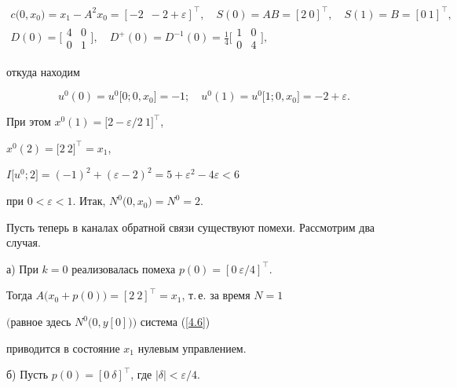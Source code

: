 \begin{exams}
\begin{gather*}
c\bigl(0, x_0\bigr)=x_1-A^2 x_0=[-2\ \; -2+\varepsilon]^{\top},\quad


S(0)=A B=[2\ 0]^{\top},\quad S(1)=B=[0\ 1]^{\top}, \\


D(0)=\bigl[\begin{smallmatrix}


4 & 0 \\ 0 & 1


\end{smallmatrix}\bigr],\quad


D^+(0)=D^{-1}(0)=\tfrac{1}{4}\bigl[\begin{smallmatrix}


1 & 0 \\ 0 & 4\end{smallmatrix}\bigr],


\end{gather*}


откуда находим


$$


u^0(0)=u^0\bigl[0; 0, x_0\bigr]=-1 ;\quad u^0(1)=u^0\bigl[1; 0, x_0\bigr]=


-2+\varepsilon.


$$


При этом $x^0(1)=\bigl[2-\varepsilon/2\ 1\bigr]^{\top}$,


$x^0(2)=\bigl[2\ 2\bigr]^{\top}=x_1$,


$I\bigl[u^0; 2\bigr]=(-1)^2+(\varepsilon-2)^2=


5+\varepsilon^2-4 \varepsilon<6$


при $0<\varepsilon<1$. Итак, $N^0\bigl(0, x_0\bigr)=N^0=2$.





Пусть теперь в каналах обратной связи существуют помехи. Рассмотрим два случая.





а) При $k=0$ реализовалась помеха $p(0)=[0\ \varepsilon/4]^{\top}$.


Тогда $A\bigl(x_0+p(0)\bigr)=[2 \ 2]^{\top}=x_1$, т.\,е. за время $N=1$


$\bigl($равное здесь $N^0\bigl(0, y[0]\bigr)\bigr)$ система (\ref{4.6})


приводится в состояние $x_1$ нулевым управлением.





б) Пусть $p(0)=[0\ \delta]^{\top}$, где $|\delta|<\varepsilon/4$.



\end{exams}
